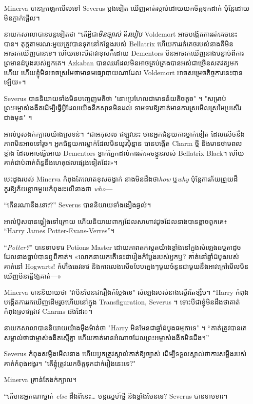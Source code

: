 Minerva បានក្រឡេកមើលទៅ Severus ម្តងទៀត ឃើញគាត់ស្តាប់ដោយយកចិត្តទុកដាក់ ប៉ុន្តែដោយមិនភ្ញាក់ផ្អើល។

នាយកសាលាបានបន្តទៀតថា “តើអ្វីជា\emph{មិនច្បាស់} គឺ\emph{របៀប} Voldemort អាចបង្កើតការរត់គេចនេះបាន។ តុក្កតាមរណៈមួយត្រូវបានទុកនៅកន្លែងរបស់ Bellatrix ហើយការរត់គេចរបស់នាងគឺមិនអាចរកឃើញបានទេ។ ហើយទោះបីជាវាខុសក៏ដោយ Dementors មិនអាចរកឃើញនាងបន្ទាប់ពីការព្រមានដំបូងរបស់ពួកគេ។ Azkaban បានឈរដែលមិនអាចគ្រប់គ្រងបានអស់ជាច្រើនសតវត្សមកហើយ ហើយខ្ញុំមិនអាចស្រមៃថាមានមធ្យោបាយណាដែល Voldemort អាចសម្រេចកិច្ចការនេះបានឡើយ»។

Severus បាននិយាយទាំងមិនបញ្ចេញមតិថា "នោះប្រហែលជាមានន័យតិចតួច" ។ "សម្រាប់ព្រះអម្ចាស់ងងឹតដើម្បីធ្វើអ្វីដែលយើងនឹកស្មានមិនដល់ ទាមទារឱ្យគាត់មានការស្រមើលស្រមៃប្រសើរជាងមុន" ។

អាល់ប៊ូសងក់ក្បាលយ៉ាងស្រទន់។ “ជាអកុសល ឥឡូវនេះ មានអ្នកជំនួយការម្នាក់ទៀត ដែលសើចនឹងភាពមិនអាចទៅរួច។ អ្នកជំនួយការម្នាក់ដែលមិនយូរប៉ុន្មាន បានបង្កើត Charm ថ្មី និងមានថាមពលខ្លាំង ដែលអាចធ្វើអោយ Dementors ខ្វាក់ភ្នែកដល់ការរត់គេចខ្លួនរបស់ Bellatrix Black។ ហើយ​គាត់​ជាប់​ពាក់ព័ន្ធ​នឹង​ហេតុផល​ផ្សេង​ទៀត​ដែរ»។

បេះដូងរបស់ Minerva កំពុងតែលោតខុសចង្វាក់ នាងមិនដឹងថា\emph{how} ឬ\emph{why} ប៉ុន្តែការភ័យព្រួយដ៏គួរឱ្យភ័យខ្លាចមួយកំពុងរះលើនាងថា \emph{who—}

“តើនរណានឹង\emph{នោះ}?” Severus បាននិយាយទាំងងឿងឆ្ងល់។

អាល់ប៊ូស​បាន​ផ្អៀង​ទៅ​ក្រោយ ហើយ​និយាយ​ពាក្យ​ដែល​សាហាវ​ដូច​ដែល​នាង​បាន​ខ្លាច​ពួកគេ៖ “Harry James Potter-Evans-Verres”។

“\emph{Potter?}” បានទាមទារ Potions Master ដោយភាពតក់ស្លុតយ៉ាងខ្លាំងនៅក្នុងសំឡេងធម្មតាដូចដែលនាងធ្លាប់បានឮពីគាត់។ «លោក​នាយក​ តើ​នេះ​ជា​រឿង​កំប្លែង​របស់​អ្នក​ឬ? គាត់នៅឆ្នាំដំបូងរបស់គាត់នៅ Hogwarts! កំហឹង​ឆេវឆាវ និង​ការ​លេងសើច​បែប​ក្មេង​ៗ​មួយ​ចំនួន​ជាមួយ​នឹង​អាវ​ក្រៅ​មើល​មិន​ឃើញ​មិន​ធ្វើ​ឱ្យ​គាត់—»

Minerva បាននិយាយថា "វាមិនមែនជារឿងកំប្លែងទេ" សំឡេងរបស់នាងស្ទើរតែខ្សឹប។ “Harry កំពុងបង្កើតការរកឃើញដើមរួចហើយនៅក្នុង Transfiguration, Severus ។ ទោះ​បី​ជា​ខ្ញុំ​មិន​ដឹង​ថា​គាត់​កំពុង​ស្រាវ​ជ្រាវ Charms ផង​ដែរ»។

នាយកសាលាបាននិយាយយ៉ាងម៉ឺងម៉ាត់ថា "Harry មិនមែនជាឆ្នាំដំបូងធម្មតាទេ" ។ “គាត់​ត្រូវ​បាន​គេ​សម្គាល់​ថា​ជា​ម្ចាស់​ងងឹត​ស្មើ​គ្នា ហើយ​គាត់​មាន​អំណាច​ដែល​ព្រះអម្ចាស់​ងងឹត​មិន​ដឹង។”

Severus កំពុងសម្លឹងមើលនាង ហើយអ្នកត្រូវស្គាល់គាត់ឱ្យច្បាស់ ដើម្បីទទួលស្គាល់ថាការសម្លឹងរបស់គាត់កំពុងអង្វរ។ "តើខ្ញុំត្រូវយកចិត្តទុកដាក់រឿងនេះទេ?"

Minerva គ្រាន់តែងក់ក្បាល។

“តើមានអ្នកណាម្នាក់ \emph{else} ដឹងពីនេះ… មន្តស្នេហ៍ថ្មី និងខ្លាំងមែនទេ? Severus បានទាមទារ។

